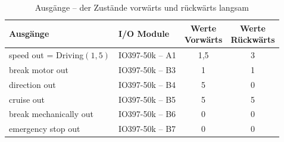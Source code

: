 \pagebreak[1]
\begin{table}[!ht]
	\centering
	\caption{Ausgänge – der Zustände vorwärts und rückwärts langsam}
	\label{Automat_man:tab:z_V_langsam}
	\begin{tabular}{llcc}
		\hline
		\textbf{Ausgänge}                               & \textbf{I/O Module}                 & \makecell{\textbf{Werte}     \\ \textbf{Vorwärts}} & \makecell{\textbf{Werte}     \\ \textbf{Rückwärts}}  \\ \hline
		\multicolumn{1}{l|}{speed out = Driving$(1,5)$} & \multicolumn{1}{l|}{IO397-50k – A1} & 1,5                      & 3 \\
		\multicolumn{1}{l|}{break motor out}            & \multicolumn{1}{l|}{IO397-50k – B3} & 1                        & 1 \\
		\multicolumn{1}{l|}{direction out}              & \multicolumn{1}{l|}{IO397-50k – B4} & 5                        & 0 \\
		\multicolumn{1}{l|}{cruise out}                 & \multicolumn{1}{l|}{IO397-50k – B5} & 5                        & 5 \\
		\multicolumn{1}{l|}{break mechanically out}     & \multicolumn{1}{l|}{IO397-50k – B6} & 0                        & 0 \\
		\multicolumn{1}{l|}{emergency stop out}         & \multicolumn{1}{l|}{IO397-50k – B7} & 0                        & 0 \\ \hline
	\end{tabular}
\end{table}
\pagebreak[1]

